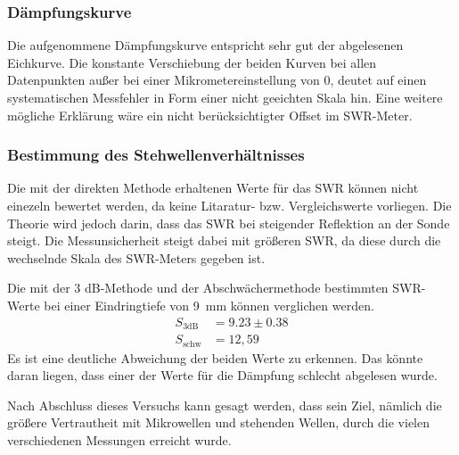     \subsubsection*{Dämpfungskurve}
        Die aufgenommene Dämpfungskurve entspricht sehr gut der abgelesenen Eichkurve. Die konstante Verschiebung der beiden Kurven bei allen Datenpunkten außer bei einer Mikrometereinstellung von 0, deutet auf einen systematischen Messfehler in Form einer nicht geeichten Skala hin. Eine weitere mögliche Erklärung wäre ein nicht berücksichtigter Offset im SWR-Meter.
    
    \subsubsection*{Bestimmung des Stehwellenverhältnisses}
        Die mit der direkten Methode erhaltenen Werte für das SWR können nicht einezeln bewertet werden, da keine Litaratur- bzw. Vergleichswerte vorliegen.
        Die Theorie wird jedoch darin, dass das SWR bei steigender Reflektion an der Sonde steigt.
        Die Messunsicherheit steigt dabei mit größeren SWR, da diese durch die wechselnde Skala des SWR-Meters gegeben ist.

        Die mit der 3 dB-Methode und der Abschwächermethode bestimmten SWR-Werte bei einer Eindringtiefe von \SI{9}{mm} können verglichen werden.
        \begin{align*}
            S_{\mathrm{3dB}} &= 9.23 \pm 0.38 \\
            S_{\mathrm{schw}} &= 12,59
        \end{align*}
        Es ist eine deutliche Abweichung der beiden Werte zu erkennen.
        Das könnte daran liegen, dass einer der Werte für die Dämpfung schlecht abgelesen wurde.

    
    Nach Abschluss dieses Versuchs kann gesagt werden, dass sein Ziel, nämlich die größere Vertrautheit mit Mikrowellen und stehenden Wellen, durch die vielen verschiedenen Messungen erreicht wurde.
